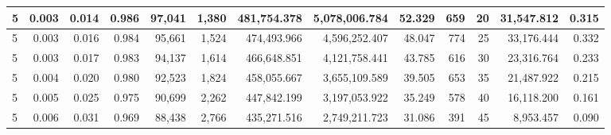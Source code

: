 \documentclass[fontsize=11pt]{article}
\begin{document}
\begin{landscape}
\begin{table}[]
\begin{tabular}{lrrrrrrrrrr|r|r|}
\multicolumn{1}{|l|}{5} & \multicolumn{1}{r|}{0.003} & \multicolumn{1}{r|}{0.014} & \multicolumn{1}{r|}{0.986} & \multicolumn{1}{r|}{97,041}  & \multicolumn{1}{r|}{1,380}  & \multicolumn{1}{r|}{481,754.378} & \multicolumn{1}{r|}{5,078,006.784} & \multicolumn{1}{r|}{52.329} & \multicolumn{1}{r|}{659}   & 20                     & 31,547.812                                & 0.315                               \\ \hline
\multicolumn{1}{|l|}{5} & \multicolumn{1}{r|}{0.003} & \multicolumn{1}{r|}{0.016} & \multicolumn{1}{r|}{0.984} & \multicolumn{1}{r|}{95,661}  & \multicolumn{1}{r|}{1,524}  & \multicolumn{1}{r|}{474,493.966} & \multicolumn{1}{r|}{4,596,252.407} & \multicolumn{1}{r|}{48.047} & \multicolumn{1}{r|}{774}   & 25                     & 33,176.444                                & 0.332                               \\ \hline
\multicolumn{1}{|l|}{5} & \multicolumn{1}{r|}{0.003} & \multicolumn{1}{r|}{0.017} & \multicolumn{1}{r|}{0.983} & \multicolumn{1}{r|}{94,137}  & \multicolumn{1}{r|}{1,614}  & \multicolumn{1}{r|}{466,648.851} & \multicolumn{1}{r|}{4,121,758.441} & \multicolumn{1}{r|}{43.785} & \multicolumn{1}{r|}{616}   & 30                     & 23,316.764                                & 0.233                               \\ \hline
\multicolumn{1}{|l|}{5} & \multicolumn{1}{r|}{0.004} & \multicolumn{1}{r|}{0.020} & \multicolumn{1}{r|}{0.980} & \multicolumn{1}{r|}{92,523}  & \multicolumn{1}{r|}{1,824}  & \multicolumn{1}{r|}{458,055.667} & \multicolumn{1}{r|}{3,655,109.589} & \multicolumn{1}{r|}{39.505} & \multicolumn{1}{r|}{653}   & 35                     & 21,487.922                                & 0.215                               \\ \hline
\multicolumn{1}{|l|}{5} & \multicolumn{1}{r|}{0.005} & \multicolumn{1}{r|}{0.025} & \multicolumn{1}{r|}{0.975} & \multicolumn{1}{r|}{90,699}  & \multicolumn{1}{r|}{2,262}  & \multicolumn{1}{r|}{447,842.199} & \multicolumn{1}{r|}{3,197,053.922} & \multicolumn{1}{r|}{35.249} & \multicolumn{1}{r|}{578}   & 40                     & 16,118.200                                & 0.161                               \\ \hline
\multicolumn{1}{|l|}{5} & \multicolumn{1}{r|}{0.006} & \multicolumn{1}{r|}{0.031} & \multicolumn{1}{r|}{0.969} & \multicolumn{1}{r|}{88,438}  & \multicolumn{1}{r|}{2,766}  & \multicolumn{1}{r|}{435,271.516} & \multicolumn{1}{r|}{2,749,211.723} & \multicolumn{1}{r|}{31.086} & \multicolumn{1}{r|}{391}   & 45                     & 8,953.457                                 & 0.090                               \\ \hline

\end{tabular}
\end{table}
\end{landscape}
\end{document}
